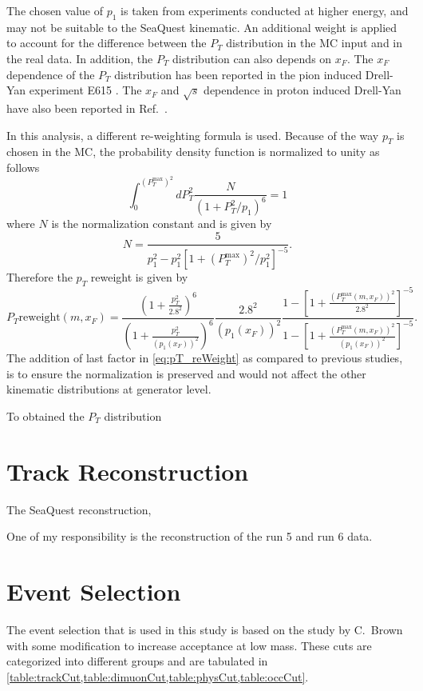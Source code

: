 \documentclass[../main.tex]{subfiles}
\begin{document}
The chosen value of $p_1$ is taken from experiments conducted at higher
energy, and may not be suitable to the SeaQuest kinematic. An additional weight is
applied to account for the difference between the $P_T$ distribution in the MC input
and in the real data. In addition, the $P_T$ distribution can also depends on $x_F$.
The $x_F$ dependence of the $P_T$ distribution has been reported in the pion induced
Drell-Yan experiment E615 \cite{conway1989}. The $x_F$ and $\sqrt{s}$ dependence in
proton induced Drell-Yan have also been reported in Ref.~\cite{prasad2020}.

In this analysis, a different re-weighting formula is used. Because of the way $p_T$ is chosen
in the MC, the probability density function is normalized to unity as follows
\begin{equation}
	\int^{\left(P_T^{\mathrm{max}}\right)^2}_0 dP_T^2 \frac{N}{\left(1+ P_T^2/p_1\right)^6}=1
\end{equation}
where $N$ is the normalization constant and is given by
\begin{equation}
	N=\frac{5}{p_1^2-p_1^2\left[ 1+ \left(P_T^{\mathrm{max}}\right)^2/p_1^2\right]^{-5}}.
\end{equation}
Therefore the $p_T$ reweight is given by
\begin{equation}
	P_T \mathrm{ reweight}\left(m,x_F\right)=
	\frac{\left(1 + \frac{p_T^2}{2.8^2} \right)^6}{\left(1 + \frac{p_T^2}{\left(p_1\left(x_F\right)\right)^2} \right)^6} \frac{2.8^2}{\left(p_1\left(x_F\right)\right)^2}\frac{1-\left[ 1+ \frac{\left(P_T^{\mathrm{max}}\left(m,x_F\right)\right)^2}{2.8^2}\right]^{-5}}{1-\left[ 1+ \frac{\left(P_T^{\mathrm{max}}\left(m,x_F\right)\right)^2}{\left(p_1\left(x_F\right)\right)^2}\right]^{-5}}.
	\label{eq:pT_reWeight}
\end{equation}
The addition of last factor in \cref{eq:pT_reWeight} as compared to previous studies,
is to ensure the normalization is preserved and would not affect the other kinematic
distributions at generator level. 

To obtained the $P_T$ distribution 


\section{Track Reconstruction}
The SeaQuest reconstruction,

One of my responsibility is the reconstruction of the run 5 and run 6 data.

\section{Event Selection}
The event selection that is used in this study is based on the study by C.~Brown
\cite{chuck-2111} with some modification to increase acceptance at low mass. These cuts
are categorized into different groups and are tabulated in \cref{table:trackCut,table:dimuonCut,table:physCut,table:occCut}.
\end{document}
